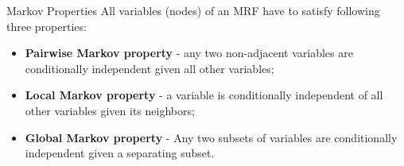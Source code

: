 \documentclass{beamer}
\begin{document}
\begin{frame}{Markov Properties}
  \scriptsize
  All variables (nodes) of an MRF have to satisfy following three properties:
  \begin{itemize}
    \item \textbf{Pairwise Markov property} - any two non-adjacent
      variables are conditionally independent given all other
      variables;
    \item \textbf{Local Markov property} - a variable is conditionally
      independent of all other variables given its neighbors;
    \item \textbf{Global Markov property} - Any two subsets of
      variables are conditionally independent given a separating
      subset.
  \end{itemize}
  \begin{example}
    \begin{center}
    \end{center}
  \end{example}
\end{frame}
\end{document}
